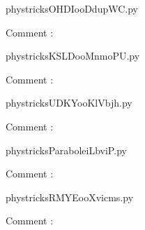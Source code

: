 
    \newcommand{\CaptionFigOHDIooDdupWC}{<+Type your caption here+>}
    \begin{center}
        
    \end{center}
    phystricksOHDIooDdupWC.py

    Comment : 

    \clearpage
    


    \newcommand{\CaptionFigKSLDooMnmoPU}{<+Type your caption here+>}
    \begin{center}
        
    \end{center}
    phystricksKSLDooMnmoPU.py

    Comment : 

    \clearpage
    


    \newcommand{\CaptionFigUDKYooKlVbjh}{<+Type your caption here+>}
    \begin{center}
        
    \end{center}
    phystricksUDKYooKlVbjh.py

    Comment : 

    \clearpage
    


    \newcommand{\CaptionFigParaboleiLbviP}{<+Type your caption here+>}
    \begin{center}
        
    \end{center}
    phystricksParaboleiLbviP.py

    Comment : 

    \clearpage
    


    \newcommand{\CaptionFigRMYEooXvicms}{<+Type your caption here+>}
    \begin{center}
        
    \end{center}
    phystricksRMYEooXvicms.py

    Comment : 

    \clearpage
    


